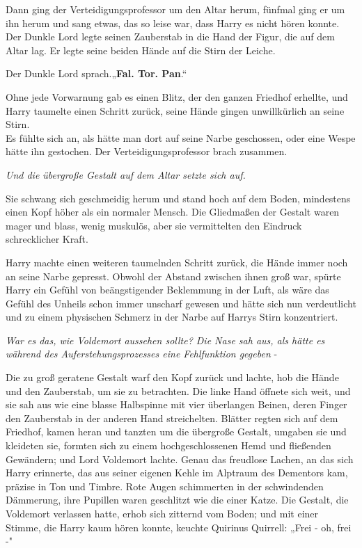 {Dann ging der Verteidigungsprofessor um den Altar herum, fünfmal ging er um ihn herum und sang etwas, das so leise war, dass Harry es nicht hören konnte. Der Dunkle Lord legte seinen Zauberstab in die Hand der Figur, die auf dem Altar lag. Er legte seine beiden Hände auf die Stirn der Leiche.

Der Dunkle Lord sprach.„\textbf{Fal. Tor. Pan}.“

Ohne jede Vorwarnung gab es einen Blitz, der den ganzen Friedhof erhellte, und Harry taumelte einen Schritt zurück, seine Hände gingen unwillkürlich an seine Stirn.\\ Es fühlte sich an, als hätte man dort auf seine Narbe geschossen, oder eine Wespe hätte ihn gestochen. Der Verteidigungsprofessor brach zusammen.

\emph{Und die übergroße Gestalt auf dem Altar setzte sich auf.}

Sie schwang sich geschmeidig herum und stand hoch auf dem Boden, mindestens einen Kopf höher als ein normaler Mensch. Die Gliedmaßen der Gestalt waren mager und blass, wenig muskulös, aber sie vermittelten den Eindruck schrecklicher Kraft.

Harry machte einen weiteren taumelnden Schritt zurück, die Hände immer noch an seine Narbe gepresst. Obwohl der Abstand zwischen ihnen groß war, spürte Harry ein Gefühl von beängstigender Beklemmung in der Luft, als wäre das Gefühl des Unheils schon immer unscharf gewesen und hätte sich nun verdeutlicht und zu einem physischen Schmerz in der Narbe auf Harrys Stirn konzentriert.

\emph{War es das, wie Voldemort aussehen sollte? Die Nase sah aus, als hätte es während des Auferstehungsprozesses eine Fehlfunktion gegeben} -

Die zu groß geratene Gestalt warf den Kopf zurück und lachte, hob die Hände und den Zauberstab, um sie zu betrachten. Die linke Hand öffnete sich weit, und sie sah aus wie eine blasse Halbspinne mit vier überlangen Beinen, deren Finger den Zauberstab in der anderen Hand streichelten. Blätter regten sich auf dem Friedhof, kamen heran und tanzten um die übergroße Gestalt, umgaben sie und kleideten sie, formten sich zu einem hochgeschlossenen Hemd und fließenden Gewändern; und Lord Voldemort lachte. Genau das freudlose Lachen, an das sich Harry erinnerte, das aus seiner eigenen Kehle im Alptraum des Dementors kam, präzise in Ton und Timbre. Rote Augen schimmerten in der schwindenden Dämmerung, ihre Pupillen waren geschlitzt wie die einer Katze. Die Gestalt, die Voldemort verlassen hatte, erhob sich zitternd vom Boden; und mit einer Stimme, die Harry kaum hören konnte, keuchte Quirinus Quirrell: „Frei - oh, frei -"

}
